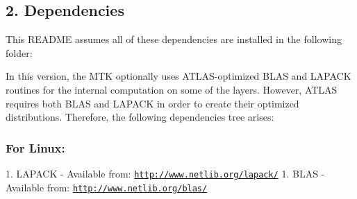 \begin{DoxyPre}\subsection*{2. Dependencies}\end{DoxyPre}



\begin{DoxyPre}\end{DoxyPre}



\begin{DoxyPre}This README assumes all of these dependencies are installed in the following
folder:\end{DoxyPre}



\begin{DoxyPre}
\end{DoxyPre}



\begin{DoxyPre}In this version, the MTK optionally uses ATLAS-optimized BLAS and LAPACK
routines for the internal computation on some of the layers. However, ATLAS
requires both BLAS and LAPACK in order to create their optimized distributions.
Therefore, the following dependencies tree arises:\end{DoxyPre}



\begin{DoxyPre}\subsubsection*{For Linux:}\end{DoxyPre}



\begin{DoxyPre}\end{DoxyPre}



\begin{DoxyPre}1. LAPACK - Available from: \href{http://www.netlib.org/lapack/}{\tt http://www.netlib.org/lapack/}
  1. BLAS - Available from: \href{http://www.netlib.org/blas/}{\tt http://www.netlib.org/blas/}\end{DoxyPre}



